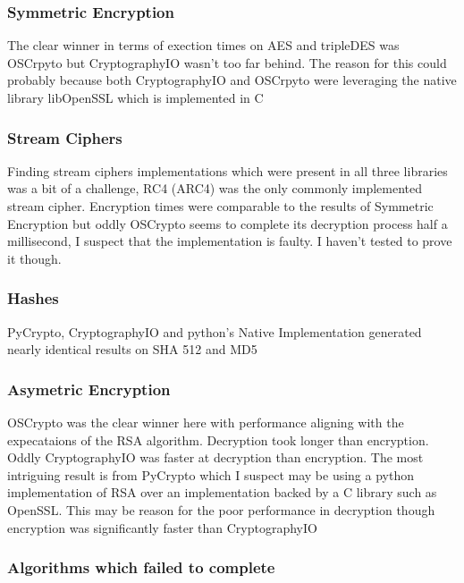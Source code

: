 \documentclass[10pt,conference]{IEEEtran}
\begin{document}
\subsubsection{Symmetric Encryption}

The clear winner in terms of exection times on AES and tripleDES was OSCrpyto but CryptographyIO wasn't too far behind. The reason for this could probably because both CryptographyIO and OSCrpyto were leveraging the native library libOpenSSL which is implemented in C

\subsubsection{Stream Ciphers}

Finding stream ciphers implementations which were present in all three libraries was a bit of a challenge, 
RC4 (ARC4) was the only commonly implemented stream cipher. Encryption times were comparable to the results of Symmetric Encryption but oddly OSCrypto seems to complete its decryption process half a millisecond, I suspect that the implementation is faulty. I haven't tested to prove it though. 

\subsubsection{Hashes}

PyCrypto, CryptographyIO and python's Native Implementation generated nearly identical results on SHA 512 and MD5

\subsubsection{Asymetric Encryption}

OSCrypto was the clear winner here with performance aligning with the expecataions of the RSA algorithm. Decryption took longer than encryption. Oddly CryptographyIO was faster at decryption than encryption. The most intriguing result is from PyCrypto which I suspect may be using a python implementation of RSA over an implementation backed by a C library such as OpenSSL. This may be reason for the poor performance in decryption though encryption was significantly faster than CryptographyIO

\subsubsection{Algorithms which failed to complete}
\end{document}
